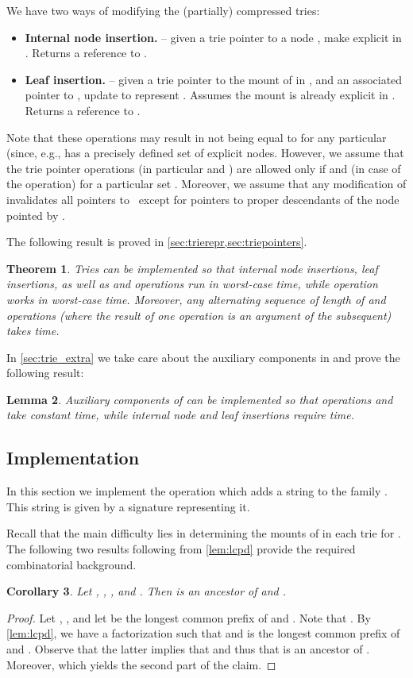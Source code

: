\documentclass[a4paper]{article}
\newtheorem{theorem}{Theorem}[section]
\newtheorem{lemma}[theorem]{Lemma}
\newtheorem{corollary}[theorem]{Corollary}
\theoremstyle{remark}
\begin{document}
We have two ways of modifying the (partially) compressed tries:
\begin{itemize}
  \item \textbf{Internal node insertion.}  -- given a trie pointer  to a node , make  explicit in .
  Returns a reference to .
  \item \textbf{Leaf insertion.}  -- given a trie pointer  to the mount of  in , and an associated pointer  to ,
update  to represent . Assumes the mount is already explicit in . Returns a reference to .
\end{itemize}
Note that these operations may result in  not being equal to  for any particular  (since, e.g., 
has a precisely defined set of explicit nodes.
However, we assume that the trie pointer operations (in particular  and ) are allowed only if 
and (in case of the  operation)  for a particular set . Moreover, we assume
that any modification of  invalidates all pointers to~ except for pointers to proper descendants of the node pointed by .

The following result is proved in \cref{sec:trierepr,sec:triepointers}.
\begin{theorem}\label{thm:trie_pointers}
Tries  can be implemented so that
internal node insertions, leaf insertions, as well as
 and  operations run in worst-case  time, while
 operation works in worst-case  time.
Moreover, any alternating sequence of length  of  and  operations (where the result of one operation is an argument of the subsequent) takes  time.
\end{theorem}
\noindent
In \cref{sec:trie_extra} we take care about the auxiliary components in 
and prove the following result:
\begin{lemma}\label{lem:trie_extra}
Auxiliary components of  can be implemented so that operations  and  take constant time,
while internal node and leaf insertions require  time.
\end{lemma}

\subsection{ Implementation}
In this section we implement the  operation which adds a string  to the family .
This string is given by a signature  representing it.

Recall that the main difficulty lies in determining the mounts  of  in each trie 
for .
The following two results following from \cref{lem:lcpd} provide the required combinatorial background.
\begin{corollary}\label{cor:lcpd}
Let , , ,
and .
Then  is an ancestor of  and .
\end{corollary}
\begin{proof}
  Let , ,
and let  be the longest common prefix of  and .
Note that .
By \cref{lem:lcpd}, we have a factorization 
such that  and  is the longest common prefix of  and .
Observe that the latter implies that  and thus that  is an ancestor of .
Moreover,  which yields the second part of the claim.
\end{proof}
\end{document}
